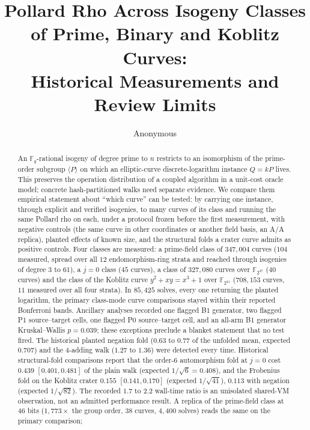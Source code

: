 \documentclass[10pt,a4paper]{article}
\title{Pollard Rho Across Isogeny Classes of Prime, Binary and Koblitz Curves:\\
  Historical Measurements and Review Limits}
\author{Anonymous}
\date{}
\theoremstyle{remark}
\newcommand{\FF}{\mathbb{F}}
\begin{document}
\maketitle

\begin{abstract}
An $\FF_q$-rational isogeny of degree prime to $n$ restricts to an isomorphism of
the prime-order subgroup $\langle P\rangle$ on which an elliptic-curve
discrete-logarithm instance $Q = kP$ lives. This preserves the operation
distribution of a coupled algorithm in a unit-cost oracle model; concrete
hash-partitioned walks need separate evidence. We compare them
empirical statement about ``which curve'' can be tested: by carrying one
instance, through explicit and verified isogenies, to many curves of its class
and running the same Pollard rho on each, under a protocol frozen before the
first measurement, with negative controls (the same curve in other
coordinates or another field basis, an A/A replica), planted effects of known
size, and the structural folds a crater curve admits as positive controls. Four
classes are measured: a prime-field class of $347{,}004$ curves ($104$
measured, spread over all $12$ endomorphism-ring strata and reached through
isogenies of degree $3$ to $61$), a $j = 0$ class ($45$ curves), a class of
$327{,}080$ curves over $\FF_{2^{37}}$ ($40$ curves) and the class of the
Koblitz curve $y^2 + xy = x^3 + 1$ over $\FF_{2^{41}}$ ($708{,}153$ curves,
$11$ measured over all four strata). In $85{,}425$ solves, every one returning
the planted logarithm, the primary class-mode curve comparisons stayed within
their reported Bonferroni bands. Ancillary analyses recorded one flagged B1
generator, two flagged P1 source--target cells, one flagged P0 source--target
cell, and an all-arm B1 generator Kruskal--Wallis $p=0.039$; these exceptions
preclude a blanket statement that no test fired. The historical planted
negation fold ($0.63$ to $0.77$ of the unfolded mean,
expected $0.707$) and the $4$-adding walk ($1.27$ to $1.36$) were detected every
time. Historical structural-fold comparisons report that the
order-$6$ automorphism fold at $j = 0$ cost $0.439$ $[0.401, 0.481]$ of the plain
walk (expected $1/\sqrt{6} = 0.408$), and the Frobenius fold on the Koblitz
crater $0.155$ $[0.141, 0.170]$ (expected $1/\sqrt{41}$), $0.113$ with negation
(expected $1/\sqrt{82}$). The recorded $1.7$ to $2.2$ wall-time ratio is an
unisolated shared-VM observation, not an admitted performance result.
A replica of the prime-field class at $46$ bits ($1{,}773\times$ the group
order, $38$ curves, $4{,}400$ solves) reads the same on the primary comparison;

\end{abstract}
\end{document}
